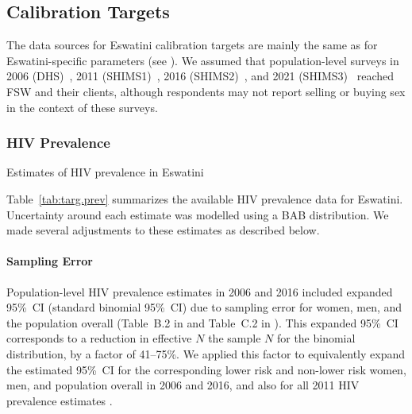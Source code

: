 \subsection{Calibration Targets}\label{mod.cal.targ}
The data sources for Eswatini calibration targets
are mainly the same as for Eswatini-specific parameters (see ).
We assumed that population-level surveys in
2006 (DHS)~\cite{SDHS2006},
2011 (SHIMS1)~\cite{Bicego2013,Justman2016},
2016 (SHIMS2)~\cite{SHIMS2}, and
2021 (SHIMS3)~\cite{SHIMS3}
reached FSW and their clients,
although respondents may not report selling or buying sex in the context of these surveys.
\subsubsection{HIV Prevalence}\label{mod.cal.targ.prev}
\begin{table}
  \centering
  \caption{Estimates of HIV prevalence in Eswatini}
  \label{tab:targ.prev}
  
\end{table}
Table~\ref{tab:targ.prev} summarizes the available HIV prevalence data for Eswatini.
Uncertainty around each estimate was modelled using a BAB distribution.
We made several adjustments to these estimates as described below.
\paragraph{Sampling Error}
Population-level HIV prevalence estimates in 2006 and 2016 included
expanded 95\%~CI (\vs standard binomial 95\%~CI)
due to sampling error for women, men, and the population overall
(Table~B.2 in \cite{SDHS2006} and Table~C.2 in \cite{SHIMS2}).
This expanded 95\%~CI corresponds to a reduction in effective $N$ \vs the sample $N$
for the binomial distribution, by a factor of 41--75\%.
We applied this factor to equivalently expand the estimated 95\%~CI for
the corresponding lower risk and non-lower risk women, men, and population overall in 2006 and 2016,
and also for all 2011 HIV prevalence estimates \cite{Bicego2013}.
